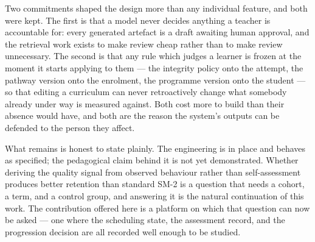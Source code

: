 Two commitments shaped the design more than any individual feature, and both were kept. The first is that a model never decides anything a teacher is accountable for: every generated artefact is a draft awaiting human approval, and the retrieval work exists to make review cheap rather than to make review unnecessary. The second is that any rule which judges a learner is frozen at the moment it starts applying to them --- the integrity policy onto the attempt, the pathway version onto the enrolment, the programme version onto the student --- so that editing a curriculum can never retroactively change what somebody already under way is measured against. Both cost more to build than their absence would have, and both are the reason the system's outputs can be defended to the person they affect.

What remains is honest to state plainly. The engineering is in place and behaves as specified; the pedagogical claim behind it is not yet demonstrated. Whether deriving the quality signal from observed behaviour rather than self-assessment produces better retention than standard SM-2 is a question that needs a cohort, a term, and a control group, and answering it is the natural continuation of this work. The contribution offered here is a platform on which that question can now be asked --- one where the scheduling state, the assessment record, and the progression decision are all recorded well enough to be studied.
